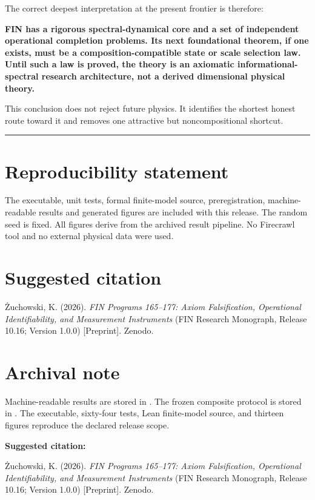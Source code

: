 \documentclass[11pt,a4paper,openany]{report}
\begin{document}
The correct deepest interpretation at the present frontier is therefore:

\textbf{FIN has a rigorous spectral-dynamical core and a set of independent operational completion problems. Its next foundational theorem, if one exists, must be a composition-compatible state or scale selection law. Until such a law is proved, the theory is an axiomatic informational-spectral research architecture, not a derived dimensional physical theory.}

This conclusion does not reject future physics. It identifies the shortest honest route toward it and removes one attractive but noncompositional shortcut.

\par\medskip\hrule\medskip

\chapter{Reproducibility statement}

The executable, unit tests, formal finite-model source, preregistration, machine-readable results and generated figures are included with this release. The random seed is fixed. All figures derive from the archived result pipeline. No Firecrawl tool and no external physical data were used.

\chapter{Suggested citation}

\.Zuchowski, K. (2026). \emph{FIN Programs 165--177: Axiom Falsification, Operational Identifiability, and Measurement Instruments} (FIN Research Monograph, Release 10.16; Version 1.0.0) [Preprint]. Zenodo.


\clearpage
\chapter*{Archival note}
Machine-readable results are stored in
.
The frozen composite protocol is stored in
.
The executable, sixty-four tests, Lean finite-model source, and thirteen
figures reproduce the declared release scope.

\medskip
\noindent\textbf{Suggested citation:}

\.Zuchowski, K. (2026). \emph{FIN Programs 165--177: Axiom Falsification,
Operational Identifiability, and Measurement Instruments}
(FIN Research Monograph, Release 10.16; Version 1.0.0) [Preprint]. Zenodo.
\end{document}
